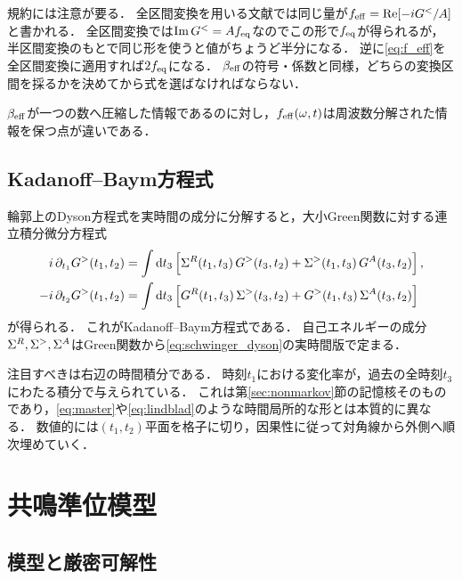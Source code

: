 \documentclass[a4paper,11pt,onecolumn]{jlreq}
\begin{document}
規約には注意が要る．
全区間変換を用いる文献では同じ量が$f_{\mathrm{eff}}=\Re[-iG^{<}/A]$と書かれる．
全区間変換では$\Im G^{<}=Af_{\mathrm{eq}}$なのでこの形で$f_{\mathrm{eq}}$が得られるが，半区間変換のもとで同じ形を使うと値がちょうど半分になる．
逆に\eqref{eq:f_eff}を全区間変換に適用すれば$2f_{\mathrm{eq}}$になる．
$\beta_{\mathrm{eff}}$の符号・係数と同様，どちらの変換区間を採るかを決めてから式を選ばなければならない．

$\beta_{\mathrm{eff}}$が一つの数へ圧縮した情報であるのに対し，$f_{\mathrm{eff}}(\omega,t)$は周波数分解された情報を保つ点が違いである．

\subsection{Kadanoff--Baym方程式}
\label{sec:keldysh_kb}

輪郭上のDyson方程式を実時間の成分に分解すると，大小Green関数に対する連立積分微分方程式
\begin{equation}
  \begin{split}
    i\,\partial_{t_1}G^{>}(t_1,t_2)
      &= \int \dd{t_3}\Big[\Sigma^{R}(t_1,t_3)\,G^{>}(t_3,t_2)
        + \Sigma^{>}(t_1,t_3)\,G^{A}(t_3,t_2)\Big]\,,\\
    -i\,\partial_{t_2}G^{>}(t_1,t_2)
      &= \int \dd{t_3}\Big[G^{R}(t_1,t_3)\,\Sigma^{>}(t_3,t_2)
        + G^{>}(t_1,t_3)\,\Sigma^{A}(t_3,t_2)\Big]
  \end{split}
  \label{eq:kadanoff_baym}
\end{equation}
が得られる．
これがKadanoff--Baym方程式である．
自己エネルギーの成分$\Sigma^{R},\Sigma^{>},\Sigma^{A}$はGreen関数から\eqref{eq:schwinger_dyson}の実時間版で定まる．

注目すべきは右辺の時間積分である．
時刻$t_1$における変化率が，過去の全時刻$t_3$にわたる積分で与えられている．
これは第\ref{sec:nonmarkov}節の記憶核そのものであり，\eqref{eq:master}や\eqref{eq:lindblad}のような時間局所的な形とは本質的に異なる．
数値的には$(t_1,t_2)$平面を格子に切り，因果性に従って対角線から外側へ順次埋めていく．

\section{共鳴準位模型}
\label{sec:rlm}

\subsection{模型と厳密可解性}
\label{sec:rlm_model}
\end{document}
